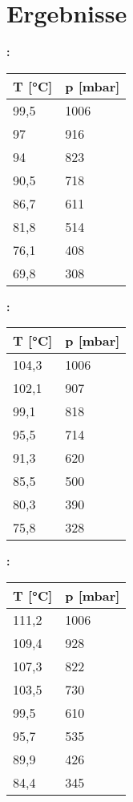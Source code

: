 
	\section*{Ergebnisse} 
		
		\textbf{:}
		\begin{table}[H]
			\label{tab:Wasser}
				\begin{tabular}{|l|l|}
				\hline
				\textbf{T [°C]}	&	\textbf{p [mbar]} \\\hline
				99,5	&	1006 \\
				97		&	916 \\
				94		&	823 \\
				90,5	&	718 \\
				86,7 	&	611 \\
				81,8	&	514 \\
				76,1	&	408 \\
				69,8	&	308 \\\hline
				\end{tabular}
		\end{table} 
		
		\textbf{:}
		\begin{table}[H]
			\label{tab:NaCl}
				\begin{tabular}{|l|l|}
				\hline
				\textbf{T [°C]}	&	\textbf{p [mbar]} \\\hline
				104,3	&	1006 \\
				102,1	&	907 \\
				99,1	&	818 \\
				95,5	&	714 \\
				91,3 	&	620 \\
				85,5	&	500 \\
				80,3	&	390 \\
				75,8	&	328 \\\hline
				\end{tabular}
		\end{table} 

		\textbf{:}
		\begin{table}[H]
			\label{tab:CaCl2}
				\begin{tabular}{|l|l|}
				\hline
				\textbf{T [°C]}	&	\textbf{p [mbar]} \\\hline
				111,2	&	1006 \\
				109,4	&	928 \\
				107,3	&	822 \\
				103,5	&	730 \\
				99,5 	&	610 \\
				95,7	&	535 \\
				89,9	&	426 \\
				84,4	&	345 \\\hline
				\end{tabular}
		\end{table} 
